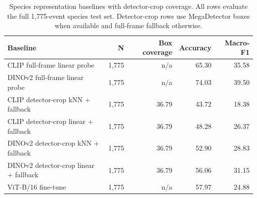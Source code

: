 \begin{table}[h]
\centering
\caption{Species representation baselines with detector-crop coverage. All rows evaluate the full 1,775-event species test set. Detector-crop rows use MegaDetector boxes when available and full-frame fallback otherwise.}
\label{tab:detector_crop_species}
\small
\begin{tabular}{lrrrr}
\toprule
Baseline & N & Box coverage & Accuracy & Macro-F1 \\
\midrule
CLIP full-frame linear probe & 1,775 & n/a & 65.30 & 35.58 \\
DINOv2 full-frame linear probe & 1,775 & n/a & 74.03 & 39.50 \\
CLIP detector-crop kNN + fallback & 1,775 & 36.79 & 43.72 & 18.38 \\
CLIP detector-crop linear + fallback & 1,775 & 36.79 & 48.28 & 26.37 \\
DINOv2 detector-crop kNN + fallback & 1,775 & 36.79 & 52.90 & 28.83 \\
DINOv2 detector-crop linear + fallback & 1,775 & 36.79 & 56.06 & 31.15 \\
ViT-B/16 fine-tune & 1,775 & n/a & 57.97 & 24.88 \\
\bottomrule
\end{tabular}
\end{table}
